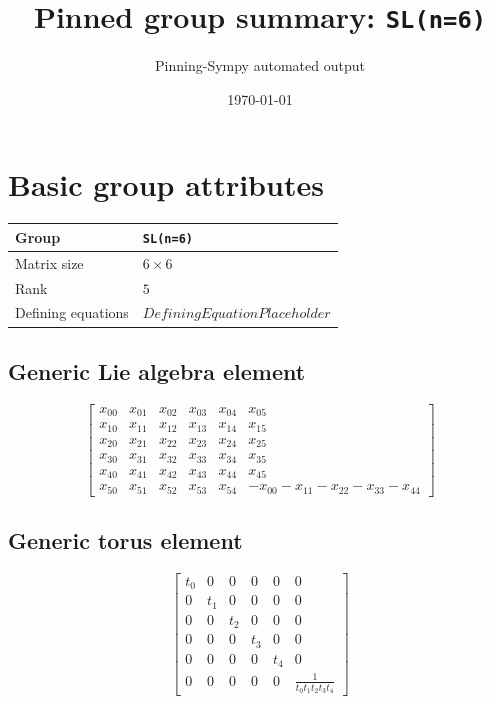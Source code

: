 \documentclass[11pt]{article}
\title{Pinned group summary: \texttt{SL(n=6)}}
\author{Pinning-Sympy automated output}
\date{\today}
\theoremstyle{definition}
\begin{document}
\maketitle
\tableofcontents

\newpage

\section{Basic group attributes}

\begin{tabular}{|l|l|}
	\hline
    Group & \texttt{SL(n=6)} \\
	\hline
    Matrix size & $6 \times 6$ \\
	\hline
    Rank & $5$ \\
	\hline
	Defining equations & $DefiningEquationPlaceholder$ \\
	\hline
\end{tabular}



\subsection{Generic Lie algebra element}
\[
\left[\begin{matrix}x_{0 0} & x_{0 1} & x_{0 2} & x_{0 3} & x_{0 4} & x_{0 5}\\x_{1 0} & x_{1 1} & x_{1 2} & x_{1 3} & x_{1 4} & x_{1 5}\\x_{2 0} & x_{2 1} & x_{2 2} & x_{2 3} & x_{2 4} & x_{2 5}\\x_{3 0} & x_{3 1} & x_{3 2} & x_{3 3} & x_{3 4} & x_{3 5}\\x_{4 0} & x_{4 1} & x_{4 2} & x_{4 3} & x_{4 4} & x_{4 5}\\x_{5 0} & x_{5 1} & x_{5 2} & x_{5 3} & x_{5 4} & - x_{0 0} - x_{1 1} - x_{2 2} - x_{3 3} - x_{4 4}\end{matrix}\right]
\]

\subsection{Generic torus element}
\[
\left[\begin{matrix}t_{0} & 0 & 0 & 0 & 0 & 0\\0 & t_{1} & 0 & 0 & 0 & 0\\0 & 0 & t_{2} & 0 & 0 & 0\\0 & 0 & 0 & t_{3} & 0 & 0\\0 & 0 & 0 & 0 & t_{4} & 0\\0 & 0 & 0 & 0 & 0 & \frac{1}{t_{0} t_{1} t_{2} t_{3} t_{4}}\end{matrix}\right]
\]
\end{document}
